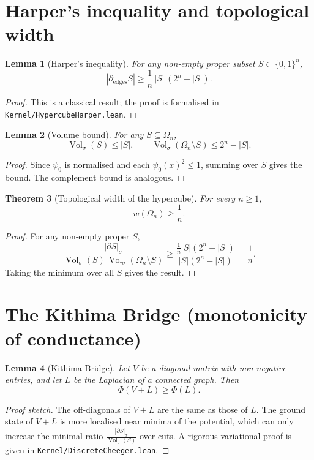 \documentclass[11pt,a4paper]{article}
\newtheorem{theorem}{Theorem}[section]
\newtheorem{lemma}[theorem]{Lemma}
\begin{document}
\section{Harper's inequality and topological width}

\begin{lemma}[Harper's inequality]\label{lem:harper}
For any non‑empty proper subset $S\subset\{0,1\}^n$,
\[
|\partial_{\mathrm{edges}} S| \ge \frac{1}{n}\,|S|\,(2^n-|S|).
\]
\end{lemma}
\begin{proof}
This is a classical result; the proof is formalised in \texttt{Kernel/HypercubeHarper.lean}.
\end{proof}

\begin{lemma}[Volume bound]\label{lem:vol}
For any $S\subseteq\Omega_n$,
\[
\operatorname{Vol}_\sigma(S) \le |S|,\qquad
\operatorname{Vol}_\sigma(\Omega_n\setminus S) \le 2^n - |S|.
\]
\end{lemma}
\begin{proof}
Since $\psi_0$ is normalised and each $\psi_0(x)^2 \le 1$, summing over $S$ gives the bound. The complement bound is analogous.
\end{proof}

\begin{theorem}[Topological width of the hypercube]\label{thm:width}
For every $n\ge 1$,
\[
w(\Omega_n) \ge \frac{1}{n}.
\]
\end{theorem}
\begin{proof}
For any non‑empty proper $S$,
\[
\frac{|\partial S|_\sigma}{\operatorname{Vol}_\sigma(S)\,\operatorname{Vol}_\sigma(\Omega_n\setminus S)}
\ge \frac{\frac{1}{n}|S|(2^n-|S|)}{|S|(2^n-|S|)} = \frac{1}{n}.
\]
Taking the minimum over all $S$ gives the result.
\end{proof}

\section{The Kithima Bridge (monotonicity of conductance)}

\begin{lemma}[Kithima Bridge]\label{lem:bridge}
Let $V$ be a diagonal matrix with non‑negative entries, and let $L$ be the Laplacian of a connected graph. Then
\[
\Phi(V + L) \ge \Phi(L).
\]
\end{lemma}
\begin{proof}[Proof sketch]
The off‑diagonals of $V+L$ are the same as those of $L$. The ground state of $V+L$ is more localised near minima of the potential, which can only increase the minimal ratio $\frac{|\partial S|_\sigma}{\operatorname{Vol}_\sigma(S)}$ over cuts. A rigorous variational proof is given in \texttt{Kernel/DiscreteCheeger.lean}.
\end{proof}
\end{document}
